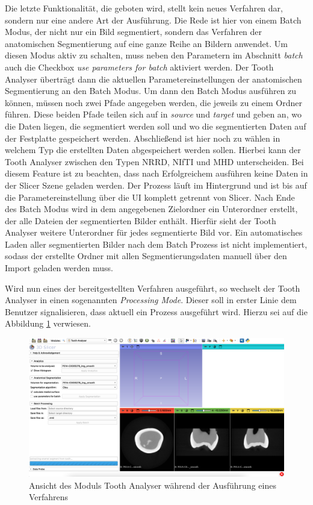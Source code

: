 Die letzte Funktionalität, die geboten wird, stellt kein neues Verfahren dar,
sondern nur eine andere Art der Ausführung. Die Rede ist hier von einem Batch Modus,
der nicht nur ein Bild segmentiert, sondern das Verfahren der anatomischen Segmentierung
auf eine ganze Reihe an Bildern anwendet. Um diesen Modus aktiv zu schalten, muss
neben den Parametern im Abschnitt \textit{batch} auch die Checkbox \textit{use
parameters for batch} aktiviert werden. Der Tooth Analyser überträgt dann die
aktuellen Parametereinstellungen der anatomischen Segmentierung an den Batch
Modus. Um dann den Batch Modus ausführen zu können, müssen noch zwei Pfade
angegeben werden, die jeweils zu einem Ordner führen. Diese beiden Pfade teilen
sich auf in \textit{source} und \textit{target} und geben an, wo die Daten liegen,
die segmentiert werden soll und wo die segmentierten Daten auf der Festplatte
gespeichert werden. Abschließend ist hier noch zu wählen in welchem Typ die erstellten
Daten abgespeichert werden sollen. Hierbei kann der Tooth Analyser zwischen den
Typen \ac{NRRD}, \ac{NIfTI} und \ac{MHD} unterscheiden. Bei diesem Feature ist zu
beachten, dass nach Erfolgreichem ausführen keine Daten in der Slicer Szene
geladen werden. Der Prozess läuft im Hintergrund und ist bis auf die Parametereinstellung
über die \ac{UI} komplett getrennt von Slicer. Nach Ende des Batch Modus wird in
dem angegebenen Zielordner ein Unterordner erstellt, der alle Dateien der
segmentierten Bilder enthält. Hierfür sieht der Tooth Analyser weitere Unterordner
für jedes segmentierte Bild vor. Ein automatisches Laden aller segmentierten
Bilder nach dem Batch Prozess ist nicht implementiert, sodass der erstellte Ordner
mit allen Segmentierungsdaten manuell über den Import geladen werden muss.

Wird nun eines der bereitgestellten Verfahren ausgeführt, so wechselt der Tooth
Analyser in einen sogenannten \textit{Processing Mode}. Dieser soll in erster
Linie dem Benutzer signalisieren, dass aktuell ein Prozess ausgeführt wird.
Hierzu sei auf die Abbildung \ref{fig:processing_mode} verwiesen.

\begin{figure}[h]
	\centering
	\includegraphics[scale=1, width=\textwidth]{img/processingMode.png}
	\caption{Ansicht des Moduls Tooth Analyser während der Ausführung eines
	Verfahrens}
	\label{fig:processing_mode}
\end{figure}

